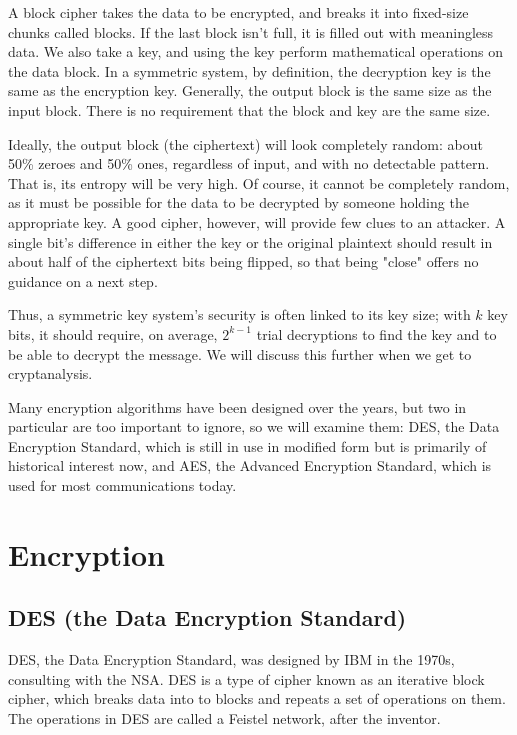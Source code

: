 \documentclass[%
 aip,
 jmp,%
 amsmath,amssymb,
 reprint,%
]{revtex4-1}
\begin{document}
A block cipher takes the data to be encrypted, and breaks it into
fixed-size chunks called blocks.  If the last block isn't full, it is
filled out with meaningless data.  We also take a key, and using the
key perform mathematical operations on the data block.  In a symmetric
system, by definition, the decryption key is the same as the
encryption key.  Generally, the output block is the same size as the
input block.  There is no requirement that the block and key are the
same size.

Ideally, the output block (the ciphertext) will look completely
random: about 50\% zeroes and 50\% ones, regardless of input, and with
no detectable pattern.  That is, its entropy will be very high.  Of
course, it cannot be completely random, as it must be possible for the
data to be decrypted by someone holding the appropriate key.  A good
cipher, however, will provide few clues to an attacker.  A single
bit's difference in either the key or the original plaintext should
result in about half of the ciphertext bits being flipped, so that
being "close" offers no guidance on a next step.

Thus, a symmetric key system's security is often linked to its key
size; with $k$ key bits, it should require, on average, $2^{k-1}$
trial decryptions to find the key and to be able to decrypt the
message.  We will discuss this further when we get to cryptanalysis.

Many encryption algorithms have been designed over the years, but two
in particular are too important to ignore, so we will examine them:
DES, the Data Encryption Standard, which is still in use in modified
form but is primarily of historical interest now, and AES, the
Advanced Encryption Standard, which is used for most communications
today.

\section{Encryption}

\subsection{DES (the Data Encryption Standard)}

DES, the Data Encryption Standard, was designed by IBM in the 1970s,
consulting with the NSA.  DES is a type of cipher known as an
iterative block cipher, which breaks data into to blocks and repeats a
set of operations on them.  The operations in DES are called a Feistel
network, after the inventor.
\end{document}

